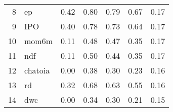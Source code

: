 \documentclass[12pt]{article}
\begin{document}
\begin{footnotesize}
\begin{longtable}{rl|c|c|c|c|c}
8   & ep               & 0.42                                                                                      & 0.80                                                                                        & 0.79                                                                                         & 0.67 & 0.17               \\
9   & IPO              & 0.40                                                                                      & 0.78                                                                                        & 0.73                                                                                         & 0.64 & 0.17               \\
10  & mom6m            & 0.11                                                                                      & 0.48                                                                                        & 0.47                                                                                         & 0.35 & 0.17               \\
11  & ndf              & 0.11                                                                                      & 0.50                                                                                        & 0.44                                                                                         & 0.35 & 0.17               \\
12  & chatoia          & 0.00                                                                                      & 0.38                                                                                        & 0.30                                                                                         & 0.23 & 0.16               \\
13  & rd               & 0.32                                                                                      & 0.68                                                                                        & 0.63                                                                                         & 0.55 & 0.16               \\
14  & dwc              & 0.00                                                                                      & 0.34                                                                                        & 0.30                                                                                         & 0.21 & 0.15               \\

\end{longtable}
\end{footnotesize}
\end{document}
